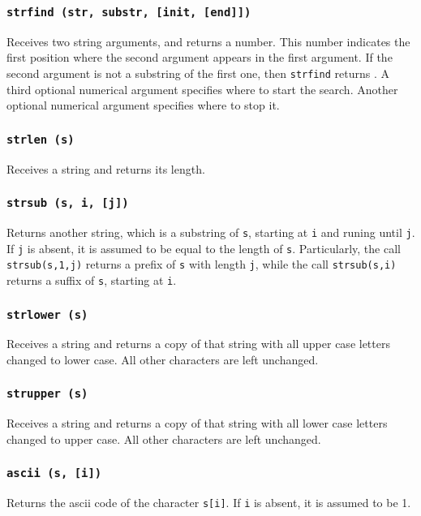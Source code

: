 \subsubsection*{{\tt strfind (str, substr, [init, [end]])}}
Receives two string arguments,
and returns a number.
This number indicates the first position where the second argument appears
in the first argument.
If the second argument is not a substring of the first one,
then \verb'strfind' returns \nil.
A third optional numerical argument specifies where to start the search.
Another optional numerical argument specifies where to stop it.

\subsubsection*{{\tt strlen (s)}}
Receives a string and returns its length.

\subsubsection*{{\tt strsub (s, i, [j])}}
Returns another string, which is a substring of \verb's',
starting at \verb'i'  and runing until \verb'j'.
If \verb'j' is absent,
it is assumed to be equal to the length of \verb's'.
Particularly, the call \verb'strsub(s,1,j)' returns a prefix of \verb's'
with length \verb'j',
while the call \verb'strsub(s,i)' returns a suffix of \verb's',
starting at \verb'i'.

\subsubsection*{{\tt strlower (s)}}
Receives a string and returns a copy of that string with all
upper case letters changed to lower case.
All other characters are left unchanged.

\subsubsection*{{\tt strupper (s)}}
Receives a string and returns a copy of that string with all
lower case letters changed to upper case.
All other characters are left unchanged.

\subsubsection*{{\tt ascii (s, [i])}}
Returns the ascii code of the character \verb's[i]'.
If \verb'i' is absent, it is assumed to be 1.

